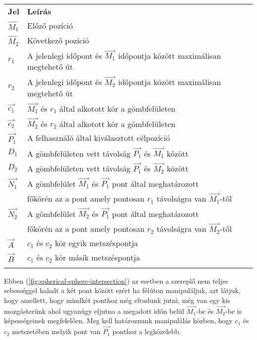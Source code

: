 \begin{tabular}{@{}ll@{}}
	\textbf{Jel} & \textbf{Leírás} \\
	$\overrightarrow{M_1}$ & Előző pozíció \\
	$\overrightarrow{M_2}$ & Következő pozíció \\
	$r_1$ & A jelenlegi időpont és $\overrightarrow{M_1}$ időpontja között maximálisan megtehető út \\
	$r_2$ & A jelenlegi időpont és $\overrightarrow{M_2}$ időpontja között maximálisan megtehető út \\
	$\overrightarrow{c_1}$ & $\overrightarrow{M_1}$ és $r_1$ által alkotott kör a gömbfelületen \\
	$\overrightarrow{c_2}$ & $\overrightarrow{M_2}$ és $r_2$ által alkotott kör a gömbfelületen \\
	$\overrightarrow{P_1}$ & A felhasználó által kiválasztott célpozíció \\
	$D_1$ & A gömbfelületen vett távolság $\overrightarrow{P_1}$ és $\overrightarrow{M_1}$ között \\
	$D_2$ & A gömbfelületen vett távolság $\overrightarrow{P_1}$ és $\overrightarrow{M_2}$ között \\
	$\overrightarrow{N_1}$ & A gömbfelület $\overrightarrow{M_1}$ és $\overrightarrow{P_1}$ pont által meghatározott \\
	& főkörén az a pont amely pontosan $r_1$ távolságra van $\overrightarrow{M_1}$-től \\
	$\overrightarrow{N_2}$ & A gömbfelület $\overrightarrow{M_2}$ és $\overrightarrow{P_1}$ pont által meghatározott \\
	& főkörén az a pont amely pontosan $r_2$ távolságra van $\overrightarrow{M_2}$-től \\
	$\overrightarrow{A}$ & $c_1$ és $c_2$ kör egyik metszéspontja \\
	$\overrightarrow{B}$ & $c_1$ és $c_2$ kör másik metszéspontja \\
	& \\
\end{tabular}

Ebben (\ref{fig:spherical-sphere-intersection}) az esetben a szereplő nem teljes sebességgel haladt a két pont között ezért ha félúton manipuláljuk, azt látjuk, hogy amellett, hogy mindkét ponthoz még eltudunk jutni, még van egy kis mozgásterünk ahol ugyanúgy eljutna a megadott időn belül $\overrightarrow{M_1}$-be és $\overrightarrow{M_2}$-be is képességeinek megfelelően. Meg kell határoznunk manipulálás közben, hogy $c_1$ és $c_2$ metszetében melyik pont van $\overrightarrow{P_1}$ ponthoz a legközelebb.

